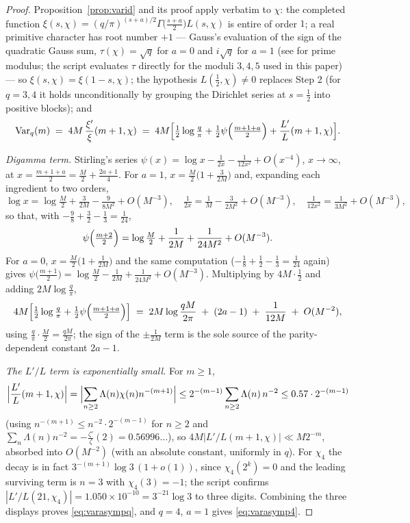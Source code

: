 \documentclass[11pt]{article}
\begin{document}
\begin{proof}
Proposition~\ref{prop:varid} and its proof apply verbatim to $\chi$:
the completed function
$\xi(s,\chi)=(q/\pi)^{(s+a)/2}\Gamma\bigl(\tfrac{s+a}2\bigr)L(s,\chi)$
is entire of order $1$; a real primitive character has root number
$+1$ --- Gauss's evaluation of the sign of the quadratic Gauss sum,
$\tau(\chi)=\sqrt q$ for $a=0$ and $i\sqrt q$ for $a=1$ (see
\cite[Ch.~2]{Dav00} for prime modulus; the script evaluates
$\tau$ directly for the moduli $3,4,5$ used in this paper) --- so
$\xi(s,\chi)=\xi(1-s,\chi)$; the hypothesis
$L(\tfrac12,\chi)\ne0$ replaces Step 2 (for $q=3,4$ it holds
unconditionally by grouping the Dirichlet series at $s=\tfrac12$ into
positive blocks); and
\begin{equation}\label{eq:varidq}
\mathrm{Var}_q(m)\;=\;4M\,\frac{\xi'}{\xi}(m+1,\chi)
\;=\;4M\Bigl[\tfrac12\log\tfrac q\pi
+\tfrac12\psi\Bigl(\tfrac{m+1+a}2\Bigr)+\frac{L'}{L}(m+1,\chi)\Bigr].
\end{equation}

\emph{Digamma term.} Stirling's series
$\psi(x)=\log x-\tfrac1{2x}-\tfrac1{12x^2}+O(x^{-4})$, $x\to\infty$,
at $x=\tfrac{m+1+a}2=\tfrac M2+\tfrac{2a+1}4$. For $a=1$,
$x=\tfrac M2\bigl(1+\tfrac3{2M}\bigr)$ and, expanding each ingredient
to two orders,
\[
\log x=\log\tfrac M2+\tfrac3{2M}-\tfrac9{8M^2}+O(M^{-3}),\quad
\tfrac1{2x}=\tfrac1M-\tfrac3{2M^2}+O(M^{-3}),\quad
\tfrac1{12x^2}=\tfrac1{3M^2}+O(M^{-3}),
\]
so that, with $-\tfrac98+\tfrac32-\tfrac13=\tfrac1{24}$,
\[
\psi\Bigl(\tfrac{m+2}2\Bigr)=\log\tfrac M2+\frac1{2M}
+\frac{1}{24M^2}+O(M^{-3}).
\]
For $a=0$, $x=\tfrac M2\bigl(1+\tfrac1{2M}\bigr)$ and the same
computation ($-\tfrac18+\tfrac12-\tfrac13=\tfrac1{24}$ again) gives
$\psi\bigl(\tfrac{m+1}2\bigr)=\log\tfrac M2-\tfrac1{2M}
+\tfrac1{24M^2}+O(M^{-3})$. Multiplying by $4M\cdot\tfrac12$ and adding
$2M\log\tfrac q\pi$,
\[
4M\Bigl[\tfrac12\log\tfrac q\pi+\tfrac12\psi\Bigl(\tfrac{m+1+a}2\Bigr)\Bigr]
\;=\;2M\log\frac{qM}{2\pi}\;+\;(2a-1)\;+\;\frac1{12M}\;+\;O(M^{-2}),
\]
using $\tfrac q\pi\cdot\tfrac M2=\tfrac{qM}{2\pi}$; the sign of the
$\pm\tfrac1{2M}$ term is the sole source of the parity-dependent
constant $2a-1$.

\emph{The $L'/L$ term is exponentially small.} For $m\ge1$,
\[
\Bigl|\frac{L'}{L}(m+1,\chi)\Bigr|
=\Bigl|\sum_{n\ge2}\Lambda(n)\chi(n)n^{-(m+1)}\Bigr|
\le2^{-(m-1)}\sum_{n\ge2}\Lambda(n)\,n^{-2}
\le0.57\cdot2^{-(m-1)}
\]
(using $n^{-(m+1)}\le n^{-2}\cdot2^{-(m-1)}$ for $n\ge2$ and
$\sum_n\Lambda(n)n^{-2}=-\tfrac{\zeta'}{\zeta}(2)=0.56996\ldots$),
so $4M|L'/L(m+1,\chi)|\ll M2^{-m}$, absorbed into $O(M^{-2})$ (with an
absolute constant, uniformly in $q$). For $\chi_4$ the decay is in fact
$3^{-(m+1)}\log3\,(1+o(1))$, since $\chi_4(2^k)=0$ and the leading
surviving term is $n=3$ with $\chi_4(3)=-1$; the script confirms
$|L'/L(21,\chi_4)|=1.050\times10^{-10}=3^{-21}\log3$ to three digits.
Combining the three displays proves \eqref{eq:varasympq}, and $q=4$,
$a=1$ gives \eqref{eq:varasymp4}.
\end{proof}
\end{document}
